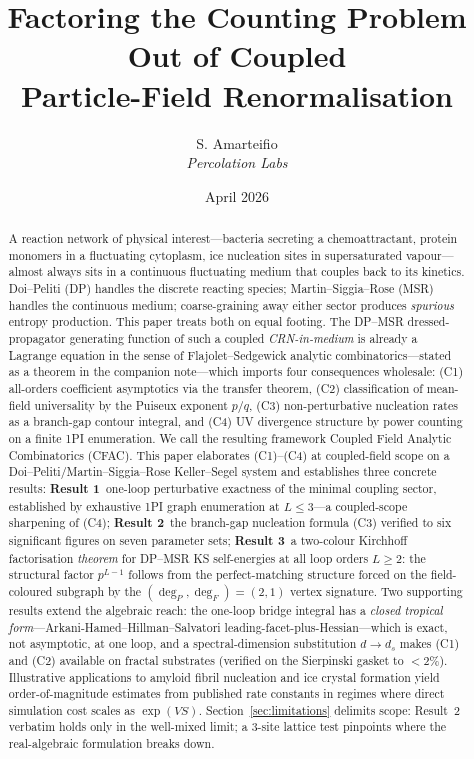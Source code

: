 \documentclass[11pt,a4paper]{article}
\title{Factoring the Counting Problem Out of Coupled\\
  Particle-Field Renormalisation}
\author{S. Amarteifio\\
  \small\textit{Percolation Labs}}
\date{April 2026}
\theoremstyle{plain}
\begin{document}
\maketitle

\begin{abstract}
A reaction network of physical interest---bacteria secreting a
chemoattractant, protein monomers in a fluctuating cytoplasm, ice
nucleation sites in supersaturated vapour---almost always sits in
a continuous fluctuating medium that couples back to its
kinetics.  Doi--Peliti (DP) handles the discrete reacting
species; Martin--Siggia--Rose (MSR) handles the continuous
medium; coarse-graining away either sector produces
\emph{spurious} entropy production.  This paper treats both on
equal footing.  The DP--MSR dressed-propagator generating
function of such a coupled \emph{CRN-in-medium} is already a
Lagrange equation in the sense of Flajolet--Sedgewick analytic
combinatorics---stated as a theorem in the companion note---which
imports four consequences wholesale: (C1) all-orders coefficient
asymptotics via the transfer theorem, (C2) classification of
mean-field universality by the Puiseux exponent $p/q$, (C3)
non-perturbative nucleation rates as a branch-gap contour
integral, and (C4) UV divergence structure by power counting on a
finite 1PI enumeration.  We call the resulting framework Coupled
Field Analytic Combinatorics (CFAC).  This paper elaborates (C1)--(C4) at
coupled-field scope on a Doi--Peliti/Martin--Siggia--Rose
Keller--Segel system and establishes three concrete results:
\textbf{Result 1}~one-loop perturbative exactness of the minimal
coupling sector, established by exhaustive 1PI graph enumeration
at $L \leq 3$---a coupled-scope sharpening of (C4);
\textbf{Result 2}~the branch-gap nucleation formula
(C3) verified to six significant figures on seven parameter sets;
\textbf{Result 3}~a two-colour Kirchhoff factorisation
\emph{theorem} for DP--MSR KS self-energies at all loop orders
$L \geq 2$: the structural factor $p^{L-1}$ follows from the
perfect-matching structure forced on the field-coloured subgraph
by the $(\deg_P,\deg_F)=(2,1)$ vertex signature.  Two supporting results
extend the algebraic reach: the one-loop bridge integral has a
\emph{closed tropical form}---Arkani-Hamed--Hillman--Salvatori
leading-facet-plus-Hessian---which is exact, not asymptotic, at one
loop, and a spectral-dimension substitution $d \to d_s$ makes (C1)
and (C2) available on fractal substrates (verified on the Sierpinski
gasket to $<2\%$).  Illustrative applications to amyloid fibril
nucleation and ice crystal formation yield order-of-magnitude
estimates from published rate constants in regimes where direct
simulation cost scales as $\exp(VS)$.  Section~\ref{sec:limitations}
delimits scope: Result~2 verbatim holds only in the well-mixed
limit; a 3-site lattice test pinpoints where the real-algebraic
formulation breaks down.
\end{abstract}
\end{document}
